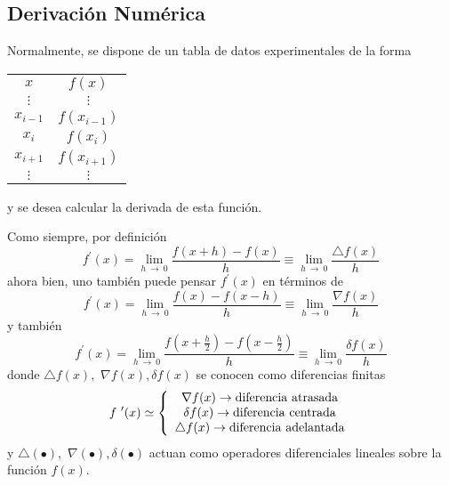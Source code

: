 \documentclass[spanish,titlepage,11pt]{article}
\begin{document}
\subsection{Derivaci\'{o}n Num\'{e}rica}

Normalmente, se dispone de un tabla de datos experimentales de la forma

\begin{center}%
\begin{tabular}
[c]{cc}%
$x$ & $f(x)$\\
$\vdots$ & $\vdots$\\
$x_{i-1}$ & $f(x_{i-1})$\\
$x_{i}$ & $f(x_{i})$\\
$x_{i+1}$ & $f(x_{i+1})$\\
$\vdots$ & $\vdots$%
\end{tabular}
\end{center}

y se desea calcular la derivada de esta funci\'{o}n.

Como siempre, por definici\'{o}n
\[
f^{\prime}(x)=\lim_{h\ \rightarrow\ 0}\frac{f(x+h)-f(x)}{h}\equiv
\lim_{h\ \rightarrow\ 0}\frac{\triangle f(x)}{h}
\]
ahora bien, uno tambi\'{e}n puede pensar $f^{\prime}(x)$ en t\'{e}rminos de
\[
f^{\prime}(x)=\lim_{h\ \rightarrow\ 0}\frac{f(x)-f(x-h)}{h}\equiv
\lim_{h\ \rightarrow\ 0}\frac{\nabla f(x)}{h}
\]
y tambi\'{e}n
\[
f^{\prime}(x)=\lim_{h\ \rightarrow\ 0}\frac{f\left(  x+\frac{h}{2}\right)
-f\left(  x-\frac{h}{2}\right)  }{h}\equiv\lim_{h\ \rightarrow\ 0}\frac{\delta
f(x)}{h}
\]
donde $\triangle f(x),$ $\nabla f(x),\delta f(x)$ se conocen como diferencias
finitas
\[
f\ ^{\prime}(x)\simeq\left\{
\begin{array}
[c]{c}%
\nabla f(x)\rightarrow\mathrm{diferencia\ atrasada}\\
\delta f(x)\rightarrow\mathrm{diferencia\ centrada}\\
\triangle f(x)\rightarrow\mathrm{diferencia\ adelantada}%
\end{array}
\right.
\]
y $\triangle\left(  \bullet\right)  ,$ $\nabla\left(  \bullet\right)
,\delta\left(  \bullet\right)  $ actuan como operadores diferenciales lineales
sobre la funci\'{o}n $f(x).$
\end{document}
